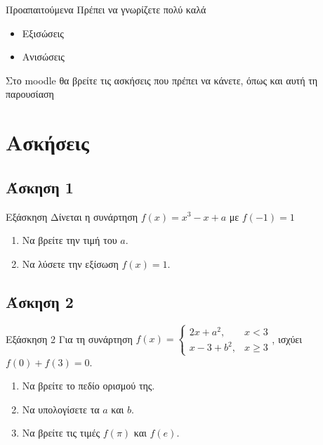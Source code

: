 \documentclass[greek]{beamer}
\begin{document}
\begin{frame}{Προαπαιτούμενα}
      Πρέπει να γνωρίζετε πολύ καλά
      \begin{itemize}
            \item Εξισώσεις
            \item Ανισώσεις
      \end{itemize}
\end{frame}

\begin{frame}
      Στο moodle θα βρείτε τις ασκήσεις που πρέπει να κάνετε, όπως και αυτή τη παρουσίαση
\end{frame}

\section{Ασκήσεις}

\subsection{Άσκηση 1}
\begin{frame}[label=Άσκηση1,t]{Εξάσκηση}
      Δίνεται η συνάρτηση $f(x)=x^3-x+a$ με $f(-1)=1$
      \begin{enumerate}
            \item<1-> Να βρείτε την τιμή του $a$.
            \item<2-> Να λύσετε την εξίσωση $f(x)=1$.
      \end{enumerate}
\end{frame}

\subsection{Άσκηση 2}
\begin{frame}[label=Άσκηση2,t]{Εξάσκηση 2}
      Για τη συνάρτηση $f(x)=\begin{cases}
                  2x+a^2,  & x<3   \\
                  x-3+b^2, & x\ge3
            \end{cases}$, ισχύει $f(0)+f(3)=0$.
      \begin{enumerate}
            \item<1-> Να βρείτε το πεδίο ορισμού της.
            \item<2-> Να υπολογίσετε τα $a$ και $b$.
            \item<3-> Να βρείτε τις τιμές $f(\pi)$ και $f(e)$.
      \end{enumerate}
\end{frame}
\end{document}
